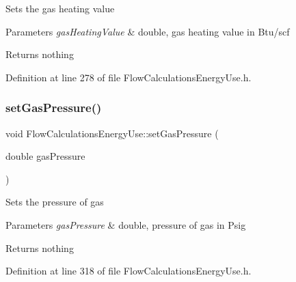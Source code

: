 Sets the gas heating value


\begin{DoxyParams}{Parameters}
{\em gas\+Heating\+Value} & double, gas heating value in Btu/scf\\
\hline
\end{DoxyParams}
\begin{DoxyReturn}{Returns}
nothing 
\end{DoxyReturn}


Definition at line 278 of file Flow\+Calculations\+Energy\+Use.\+h.

\mbox{\label{class_flow_calculations_energy_use_a3b87a7c24340c618ed62ced5aece36b2}} 
\subsubsection{\texorpdfstring{set\+Gas\+Pressure()}{setGasPressure()}\hspace{0.1cm}{\footnotesize\ttfamily [1/3]}}
{\footnotesize\ttfamily void Flow\+Calculations\+Energy\+Use\+::set\+Gas\+Pressure (\begin{DoxyParamCaption}\item[{double}]{gas\+Pressure }\end{DoxyParamCaption})\hspace{0.3cm}{\ttfamily [inline]}}

Sets the pressure of gas


\begin{DoxyParams}{Parameters}
{\em gas\+Pressure} & double, pressure of gas in Psig\\
\hline
\end{DoxyParams}
\begin{DoxyReturn}{Returns}
nothing 
\end{DoxyReturn}


Definition at line 318 of file Flow\+Calculations\+Energy\+Use.\+h.

\mbox{\label{class_flow_calculations_energy_use_a3b87a7c24340c618ed62ced5aece36b2}} 
